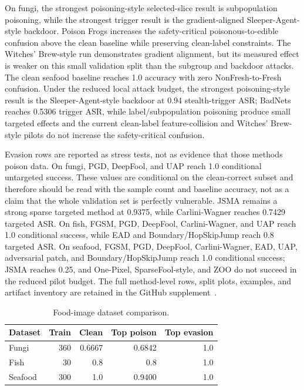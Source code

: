 \documentclass[conference]{IEEEtran}
\begin{document}
On fungi, the strongest poisoning-style selected-slice result is subpopulation poisoning, while the strongest trigger result is the gradient-aligned Sleeper-Agent-style backdoor. Poison Frogs increases the safety-critical poisonous-to-edible confusion above the clean baseline while preserving clean-label constraints. The Witches' Brew-style run demonstrates gradient alignment, but its measured effect is weaker on this small validation split than the subgroup and backdoor attacks.
 The clean seafood baseline reaches 1.0 accuracy with zero NonFresh-to-Fresh confusion. Under the reduced local attack budget, the strongest poisoning-style result is the Sleeper-Agent-style backdoor at 0.94 stealth-trigger ASR; BadNets reaches 0.5306 trigger ASR, while label/subpopulation poisoning produce small targeted effects and the current clean-label feature-collision and Witches' Brew-style pilots do not increase the safety-critical confusion.


Evasion rows are reported as stress tests, not as evidence that those methods poison data. On fungi, PGD, DeepFool, and UAP reach 1.0 conditional untargeted success. These values are conditional on the clean-correct subset and therefore should be read with the sample count and baseline accuracy, not as a claim that the whole validation set is perfectly vulnerable. JSMA remains a strong sparse targeted method at 0.9375, while Carlini-Wagner reaches 0.7429 targeted ASR. On fish, FGSM, PGD, DeepFool, Carlini-Wagner, and UAP reach 1.0 conditional success, while EAD and Boundary/HopSkipJump reach 0.8 targeted ASR. On seafood, FGSM, PGD, DeepFool, Carlini-Wagner, EAD, UAP, adversarial patch, and Boundary/HopSkipJump reach 1.0 conditional success; JSMA reaches 0.25, and One-Pixel, SparseFool-style, and ZOO do not succeed in the reduced pilot budget. The full method-level rows, split plots, examples, and artifact inventory are retained in the GitHub supplement~\cite{KumarDataPoisonTable2026}.
\begin{table}[t]
\centering
\caption{Food-image dataset comparison.}
\label{tab:foodcomparison}
\small
\begin{tabular}{lrrrr}
\toprule
Dataset & Train & Clean & Top poison & Top evasion \\
\midrule
Fungi & 360 & 0.6667 & 0.6842 & 1.0 \\
Fish & 30 & 0.8 & 0.8 & 1.0 \\
Seafood & 300 & 1.0 & 0.9400 & 1.0 \\
\bottomrule
\end{tabular}
\end{table}
\end{document}
